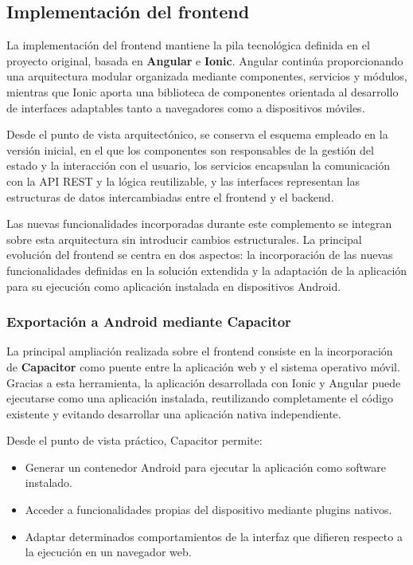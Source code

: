 \subsection{Implementación del frontend}
\label{sec:frontend_impl}

La implementación del frontend mantiene la pila tecnológica definida en el proyecto original, basada en \textbf{Angular} e \textbf{Ionic}. Angular continúa proporcionando una arquitectura modular organizada mediante componentes, servicios y módulos, mientras que Ionic aporta una biblioteca de componentes orientada al desarrollo de interfaces adaptables tanto a navegadores como a dispositivos móviles.

Desde el punto de vista arquitectónico, se conserva el esquema empleado en la versión inicial, en el que los componentes son responsables de la gestión del estado y la interacción con el usuario, los servicios encapsulan la comunicación con la API REST y la lógica reutilizable, y las interfaces representan las estructuras de datos intercambiadas entre el frontend y el backend.

Las nuevas funcionalidades incorporadas durante este complemento se integran sobre esta arquitectura sin introducir cambios estructurales. La principal evolución del frontend se centra en dos aspectos: la incorporación de las nuevas funcionalidades definidas en la solución extendida y la adaptación de la aplicación para su ejecución como aplicación instalada en dispositivos Android.

\subsubsection{Exportación a Android mediante Capacitor}

La principal ampliación realizada sobre el frontend consiste en la incorporación de \textbf{Capacitor} como puente entre la aplicación web y el sistema operativo móvil. Gracias a esta herramienta, la aplicación desarrollada con Ionic y Angular puede ejecutarse como una aplicación instalada, reutilizando completamente el código existente y evitando desarrollar una aplicación nativa independiente.

Desde el punto de vista práctico, Capacitor permite:

\begin{itemize}
    \item Generar un contenedor Android para ejecutar la aplicación como software instalado.
    \item Acceder a funcionalidades propias del dispositivo mediante plugins nativos.
    \item Adaptar determinados comportamientos de la interfaz que difieren respecto a la ejecución en un navegador web.
\end{itemize}


